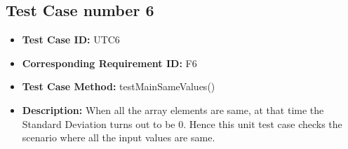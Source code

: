 \documentclass[a4paper, 12pt]{article}
\begin{document}
\subsection*{Test Case number 6}
    \begin{itemize}
        \item \textbf{Test Case ID: } UTC6
        \item \textbf{Corresponding Requirement ID: } F6
        \item \textbf{Test Case Method: } testMainSameValues()
        \item \textbf{Description: } When all the array elements are same, at that time the Standard Deviation turns out to be 0. Hence this unit test case checks the scenario where all the input values are same. 
    \end{itemize}
\end{document}

